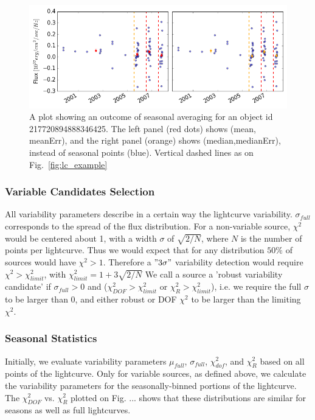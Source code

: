 \documentclass[fleqn,usenatbib]{mnras}  %
\begin{document}
\begin{figure}
\label{fig:lc_example_seasonal}
 \includegraphics[width=\textwidth]{Lightcurve_full_seasonal_obj_217720894888346425.png}
 \cprotect\caption{A plot showing an outcome of seasonal averaging for an object id 217720894888346425. The left panel (red dots) shows  (mean, meanErr),  and the right panel (orange) shows (median,medianErr), instead of seasonal points (blue). Vertical dashed lines as on Fig.~\ref{fig:lc_example}}
\end{figure}

\subsubsection{Variable Candidates Selection}
All variability parameters describe in a certain way the lightcurve variability. $\sigma_{full}$  corresponds to the spread of the flux distribution. For a non-variable source, $\chi^{2}$ would be centered about 1, with a width $\sigma$ of $\sqrt{2/N}$, where $N$ is the number of points per lightcurve. Thus we would expect that for any distribution $50\%$ of sources would have $\chi^{2}>1$. Therefore a $"3\sigma"$ variability detection would require $\chi^{2} > \chi^{2}_{limit}$, with $\chi^{2}_{limit} = 1 + 3\sqrt{2/N}$
We call a source a 'robust variability candidate' if $\sigma_{full}>0$ and ($\chi^{2}_{DOF} > \chi^{2}_{limit}$ or $\chi^{2}_{R} > \chi^{2}_{limit}$), i.e. we require the full $\sigma$ to be larger than 0, and either robust or DOF $\chi^{2}$ to be larger than the limiting $\chi^{2}$. 

\subsubsection{Seasonal Statistics}
Initially, we evaluate variability parameters $\mu_{full}$, $\sigma_{full}$, $\chi^{2}_{dof}$, and $\chi^{2}_{R}$ based on all points of the lightcurve. Only for variable sources, as defined above, we calculate the variability parameters for the seasonally-binned portions of the lightcurve. The $\chi^{2}_{DOF}$ vs. $\chi^{2}_{R}$ plotted on Fig. ...  shows that these distributions are similar for seasons as well as full lightcurves.    
\end{document}
